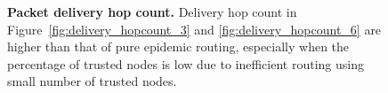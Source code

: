 \documentclass[11pt]{article}
\begin{document}
\begin{figure}[h!]
\center
{}
\hfill
{}
\caption{{\bf Packet delivery hop count.}
Delivery hop count in Figure~\ref{fig:delivery_hopcount_3} and \ref{fig:delivery_hopcount_6} are higher than that of pure epidemic routing, especially when the percentage of trusted nodes is low due to inefficient routing using small number of trusted nodes.
}
\label{fig:delivery_hopcount}
\end{figure}
\end{document}
